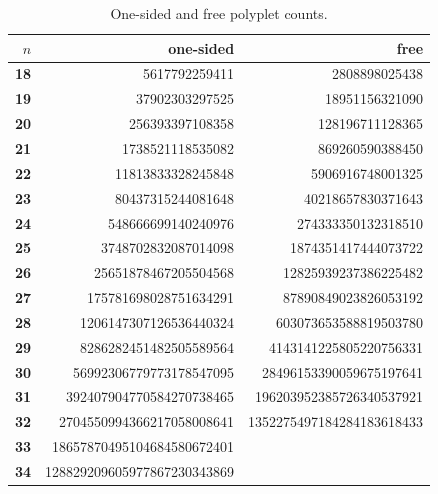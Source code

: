 \documentclass[11pt]{article}
\begin{document}
\begin{table}[htbp]
\centering
\begin{tabular}{r | r r}
\toprule
$n$         &                         one-sided &                            free\\
\midrule
\textbf{18} &               \num{5617792259411} &             \num{2808898025438}\\
\textbf{19} &              \num{37902303297525} &            \num{18951156321090}\\
\textbf{20} &             \num{256393397108358} &           \num{128196711128365}\\
\textbf{21} &            \num{1738521118535082} &           \num{869260590388450}\\
\textbf{22} &           \num{11813833328245848} &          \num{5906916748001325}\\
\textbf{23} &           \num{80437315244081648} &         \num{40218657830371643}\\
\textbf{24} &          \num{548666699140240976} &        \num{274333350132318510}\\
\textbf{25} &         \num{3748702832087014098} &       \num{1874351417444073722}\\
\textbf{26} &        \num{25651878467205504568} &      \num{12825939237386225482}\\
\textbf{27} &       \num{175781698028751634291} &      \num{87890849023826053192}\\
\textbf{28} &      \num{1206147307126536440324} &     \num{603073653588819503780}\\
\textbf{29} &      \num{8286282451482505589564} &    \num{4143141225805220756331}\\
\textbf{30} &     \num{56992306779773178547095} &   \num{28496153390059675197641}\\
\textbf{31} &    \num{392407904770584270738465} &  \num{196203952385726340537921}\\
\textbf{32} &   \num{2704550994366217058008641} & \num{1352275497184284183618433}\\
\textbf{33} &  \num{18657870495104684580672401}\\
\textbf{34} & \num{128829209605977867230343869}\\
\bottomrule
\end{tabular}
\caption{One-sided and free polyplet counts.}
\label{tab:onefree}
\end{table}
\end{document}
